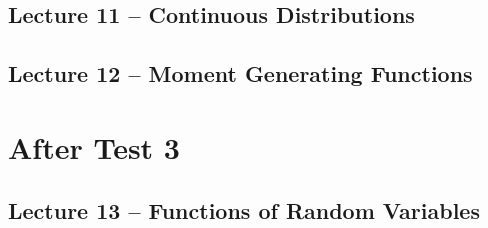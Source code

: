 \documentclass{article}
\begin{document}
\subsection{Lecture 11 -- Continuous Distributions}
\newpage

\subsection{Lecture 12 -- Moment Generating Functions}
\newpage

\section{After Test 3}

\secttoc

\subsection{Lecture 13 -- Functions of Random Variables}
\newpage
\end{document}
